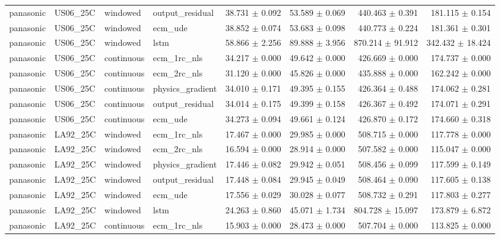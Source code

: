 \begin{longtable}{llllrrrr}
panasonic & US06\_25C & windowed & output\_residual & 38.731 $\pm$ 0.092 & 53.589 $\pm$ 0.069 & 440.463 $\pm$ 0.391 & 181.115 $\pm$ 0.154 \\
panasonic & US06\_25C & windowed & ecm\_ude & 38.852 $\pm$ 0.074 & 53.683 $\pm$ 0.098 & 440.773 $\pm$ 0.224 & 181.361 $\pm$ 0.301 \\
panasonic & US06\_25C & windowed & lstm & 58.866 $\pm$ 2.256 & 89.888 $\pm$ 3.956 & 870.214 $\pm$ 91.912 & 342.432 $\pm$ 18.424 \\
panasonic & US06\_25C & continuous & ecm\_1rc\_nls & 34.217 $\pm$ 0.000 & 49.642 $\pm$ 0.000 & 426.669 $\pm$ 0.000 & 174.737 $\pm$ 0.000 \\
panasonic & US06\_25C & continuous & ecm\_2rc\_nls & 31.120 $\pm$ 0.000 & 45.826 $\pm$ 0.000 & 435.888 $\pm$ 0.000 & 162.242 $\pm$ 0.000 \\
panasonic & US06\_25C & continuous & physics\_gradient & 34.010 $\pm$ 0.171 & 49.395 $\pm$ 0.155 & 426.364 $\pm$ 0.488 & 174.062 $\pm$ 0.281 \\
panasonic & US06\_25C & continuous & output\_residual & 34.014 $\pm$ 0.175 & 49.399 $\pm$ 0.158 & 426.367 $\pm$ 0.492 & 174.071 $\pm$ 0.291 \\
panasonic & US06\_25C & continuous & ecm\_ude & 34.273 $\pm$ 0.094 & 49.661 $\pm$ 0.124 & 426.870 $\pm$ 0.172 & 174.660 $\pm$ 0.318 \\
panasonic & LA92\_25C & windowed & ecm\_1rc\_nls & 17.467 $\pm$ 0.000 & 29.985 $\pm$ 0.000 & 508.715 $\pm$ 0.000 & 117.778 $\pm$ 0.000 \\
panasonic & LA92\_25C & windowed & ecm\_2rc\_nls & 16.594 $\pm$ 0.000 & 28.914 $\pm$ 0.000 & 507.582 $\pm$ 0.000 & 115.047 $\pm$ 0.000 \\
panasonic & LA92\_25C & windowed & physics\_gradient & 17.446 $\pm$ 0.082 & 29.942 $\pm$ 0.051 & 508.456 $\pm$ 0.099 & 117.599 $\pm$ 0.149 \\
panasonic & LA92\_25C & windowed & output\_residual & 17.448 $\pm$ 0.084 & 29.945 $\pm$ 0.049 & 508.464 $\pm$ 0.090 & 117.605 $\pm$ 0.138 \\
panasonic & LA92\_25C & windowed & ecm\_ude & 17.556 $\pm$ 0.029 & 30.028 $\pm$ 0.077 & 508.732 $\pm$ 0.291 & 117.803 $\pm$ 0.277 \\
panasonic & LA92\_25C & windowed & lstm & 24.263 $\pm$ 0.860 & 45.071 $\pm$ 1.734 & 804.728 $\pm$ 15.097 & 173.879 $\pm$ 6.872 \\
panasonic & LA92\_25C & continuous & ecm\_1rc\_nls & 15.903 $\pm$ 0.000 & 28.473 $\pm$ 0.000 & 507.704 $\pm$ 0.000 & 113.825 $\pm$ 0.000 \\

\end{longtable}
